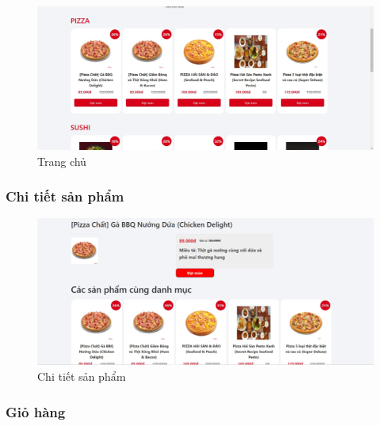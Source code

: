 \documentclass[a4paper]{article}
\begin{document}
\begin{figure}[!h]
    \begin{center}
        \includegraphics[scale=0.4]{Images/screen_flow/showproductHome.jpg}
    \end{center}
    \hspace{0.3cm}
    \caption{Trang chủ}
\end{figure}
\newpage
\subsubsection{Chi tiết sản phẩm}

\begin{figure}[!h]
    \begin{center}
        \includegraphics[scale=0.4]{Images/screen_flow/detail_product.jpg}
    \end{center}
    \hspace{0.3cm}
    \caption{Chi tiết sản phẩm}
\end{figure}

\subsubsection{Giỏ hàng}
\end{document}
